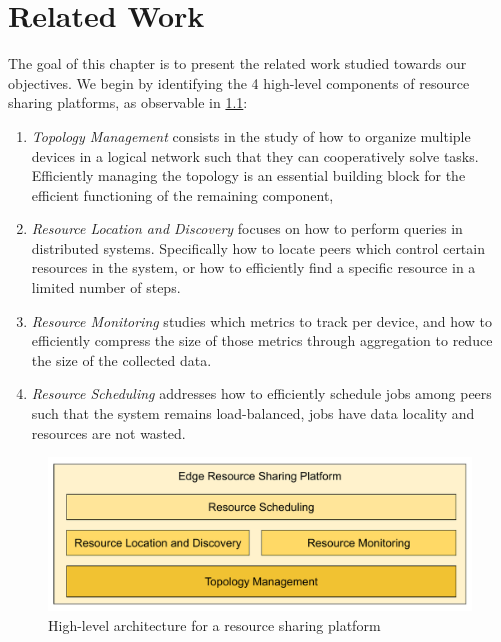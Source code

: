\chapter{Related Work} 
\label{cha:related_work}

The goal of this chapter is to present the related work studied towards our objectives. We begin by identifying the 4 high-level components of resource sharing platforms, as observable in \ref{fig:proposed_architecture}:

\begin{enumerate}

    \item \textit{Topology Management} consists in the study of how to organize multiple devices in a logical network such that they can cooperatively solve tasks. Efficiently managing the topology is an essential building block for the efficient functioning of the remaining component,
    
    \item \textit{Resource Location and Discovery} focuses on how to perform queries in distributed systems. Specifically how to locate peers which control certain resources in the system, or how to efficiently find a specific resource in a limited number of steps.
    
    \item \textit{Resource Monitoring} studies which metrics to track per device, and how to efficiently compress the size of those metrics through aggregation to reduce the size of the collected data.

    \item \textit{Resource Scheduling} addresses how to efficiently schedule jobs among peers such that the system remains load-balanced, jobs have data locality and resources are not wasted.

\end{enumerate}

\begin{figure}[h]
    \centering
    \includegraphics[width=\linewidth]{Figures/proposed_architecture.pdf}
    \caption{High-level architecture for a resource sharing platform}
    \label{fig:proposed_architecture}
\end{figure}

